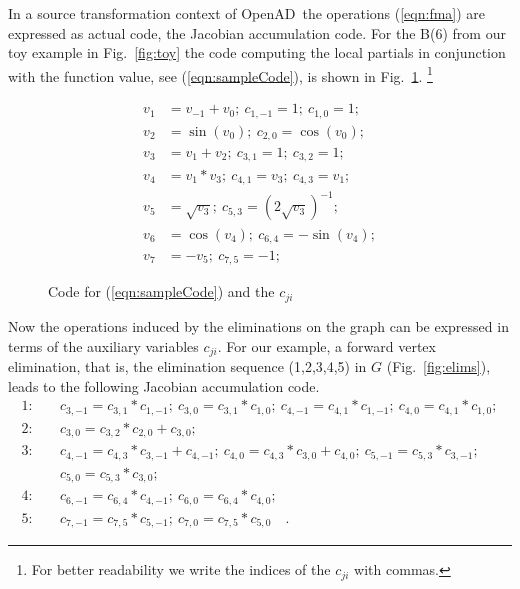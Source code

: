 \documentclass[11pt]{article}
\newcommand{\OpenAD}{OpenAD}
\newcommand{\reffig}[1]{{Fig.~\ref{#1}}}
\newcommand{\refeqn}[1]{{(\ref{#1})}}
\begin{document}
In a source transformation context of \OpenAD\ the operations \refeqn{eqn:fma} are 
expressed as actual code, the Jacobian accumulation code. For the 
B(6) from our toy example in \reffig{fig:toy} the code computing 
the local partials in conjunction with the function value, see \refeqn{eqn:sampleCode}, 
is shown in 
\reffig{fig:toyAndPartials}.
\footnote{
For better readability we write the indices of the $c_{ji}$ with commas.
} 
\begin{figure}
\begin{minipage}{\linewidth}
\begin{align*}
 v_1&=v_{-1}+v_0;~c_{1,-1}=1;~c_{1,0}=1; \\
 v_2&=\sin(v_0);~c_{2,0}=\cos(v_0); \\
 v_3&=v_1+v_2;~c_{3,1}=1;~c_{3,2}=1; \\
 v_4&=v_1*v_3;~c_{4,1}=v_3;~c_{4,3}=v_1; \\
 v_5&=\sqrt{v_3};~c_{5,3}=(2\sqrt{v_3})^{-1}; \\
 v_6&=\cos(v_4);~c_{6,4}=-\sin(v_4); \\
 v_7&=-v_5;~c_{7,5}=-1;
\end{align*}
\end{minipage}
\caption{Code for \refeqn{eqn:sampleCode} and the $c_{ji}$}\label{fig:toyAndPartials}
\end{figure}
Now the operations induced by the eliminations on the graph can 
be expressed in terms of the auxiliary variables $c_{ji}$.
For our example, a forward vertex elimination, that is, the elimination
sequence (1,2,3,4,5) in $G$ (\reffig{fig:elims}), leads to the
following Jacobian accumulation code.
{
\begin{align*}
1:\quad  &c_{3,-1}=c_{3,1} * c_{1,-1};~c_{3,0}=c_{3,1} * c_{1,0};~c_{4,-1}=c_{4,1} * c_{1,-1};~c_{4,0}=c_{4,1} * c_{1,0}; \\
2:\quad  &c_{3,0}=c_{3,2} * c_{2,0}+c_{3,0}; \\
3:\quad  &c_{4,-1}=c_{4,3} * c_{3,-1}+c_{4,-1};~c_{4,0}=c_{4,3} * c_{3,0}+c_{4,0};~c_{5,-1}=c_{5,3} * c_{3,-1}; \\
&c_{5,0}=c_{5,3} * c_{3,0}; \\
4:\quad  &c_{6,-1}=c_{6,4} * c_{4,-1};~c_{6,0}=c_{6,4} * c_{4,0}; \\
5:\quad  &c_{7,-1}=c_{7,5} * c_{5,-1};~c_{7,0}=c_{7,5} * c_{5,0} \quad .
\end{align*}
}
\end{document}
